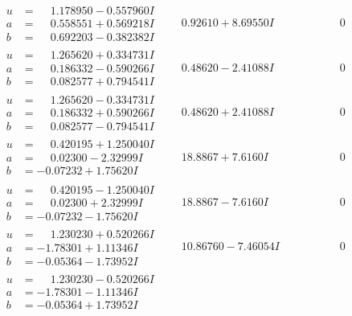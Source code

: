 \documentclass[1p]{elsarticle_modified}
\theoremstyle{definition}
\begin{document}
$$\begin{array}{c|c|c}
\begin{aligned}
u &= \phantom{-}1.178950 - 0.557960 I \\
a &= \phantom{-}0.558551 + 0.569218 I \\
b &= \phantom{-}0.692203 - 0.382382 I\end{aligned}
 & \phantom{-}0.92610 + 8.69550 I & \phantom{-0.000000 } 0 \\ \hline\begin{aligned}
u &= \phantom{-}1.265620 + 0.334731 I \\
a &= \phantom{-}0.186332 - 0.590266 I \\
b &= \phantom{-}0.082577 + 0.794541 I\end{aligned}
 & \phantom{-}0.48620 - 2.41088 I & \phantom{-0.000000 } 0 \\ \hline\begin{aligned}
u &= \phantom{-}1.265620 - 0.334731 I \\
a &= \phantom{-}0.186332 + 0.590266 I \\
b &= \phantom{-}0.082577 - 0.794541 I\end{aligned}
 & \phantom{-}0.48620 + 2.41088 I & \phantom{-0.000000 } 0 \\ \hline\begin{aligned}
u &= \phantom{-}0.420195 + 1.250040 I \\
a &= \phantom{-}0.02300 - 2.32999 I \\
b &= -0.07232 + 1.75620 I\end{aligned}
 & \phantom{-}18.8867 + 7.6160 I & \phantom{-0.000000 } 0 \\ \hline\begin{aligned}
u &= \phantom{-}0.420195 - 1.250040 I \\
a &= \phantom{-}0.02300 + 2.32999 I \\
b &= -0.07232 - 1.75620 I\end{aligned}
 & \phantom{-}18.8867 - 7.6160 I & \phantom{-0.000000 } 0 \\ \hline\begin{aligned}
u &= \phantom{-}1.230230 + 0.520266 I \\
a &= -1.78301 + 1.11346 I \\
b &= -0.05364 - 1.73952 I\end{aligned}
 & \phantom{-}10.86760 - 7.46054 I & \phantom{-0.000000 } 0 \\ \hline\begin{aligned}
u &= \phantom{-}1.230230 - 0.520266 I \\
a &= -1.78301 - 1.11346 I \\
b &= -0.05364 + 1.73952 I\end{aligned}

\end{array}$$
\end{document}
